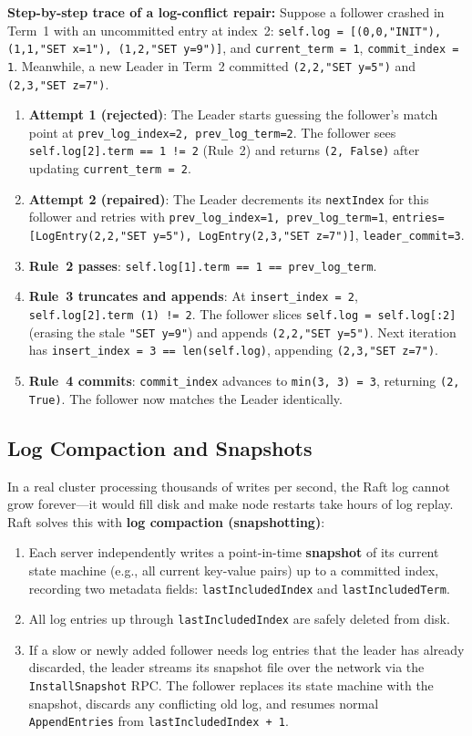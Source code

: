 \textbf{Step-by-step trace of a log-conflict repair:} Suppose a follower crashed in Term~1 with an uncommitted entry at index~2: \texttt{self.log = [(0,0,"INIT"), (1,1,"SET x=1"), (1,2,"SET y=9")]}, and \texttt{current\_term = 1}, \texttt{commit\_index = 1}. Meanwhile, a new Leader in Term~2 committed \texttt{(2,2,"SET y=5")} and \texttt{(2,3,"SET z=7")}.
\begin{enumerate}[leftmargin=18pt]
  \item \textbf{Attempt 1 (rejected)}: The Leader starts guessing the follower's match point at \texttt{prev\_log\_index=2, prev\_log\_term=2}. The follower sees \texttt{self.log[2].term == 1 != 2} (Rule~2) and returns \texttt{(2, False)} after updating \texttt{current\_term = 2}.
  \item \textbf{Attempt 2 (repaired)}: The Leader decrements its \texttt{nextIndex} for this follower and retries with \texttt{prev\_log\_index=1, prev\_log\_term=1}, \texttt{entries=[LogEntry(2,2,"SET y=5"), LogEntry(2,3,"SET z=7")]}, \texttt{leader\_commit=3}.
  \item \textbf{Rule~2 passes}: \texttt{self.log[1].term == 1 == prev\_log\_term}.
  \item \textbf{Rule~3 truncates and appends}: At \texttt{insert\_index = 2}, \texttt{self.log[2].term (1) != 2}. The follower slices \texttt{self.log = self.log[:2]} (erasing the stale \texttt{"SET y=9"}) and appends \texttt{(2,2,"SET y=5")}. Next iteration has \texttt{insert\_index = 3 == len(self.log)}, appending \texttt{(2,3,"SET z=7")}.
  \item \textbf{Rule~4 commits}: \texttt{commit\_index} advances to \texttt{min(3, 3) = 3}, returning \texttt{(2, True)}. The follower now matches the Leader identically.
\end{enumerate}

\subsection{Log Compaction and Snapshots}

In a real cluster processing thousands of writes per second, the Raft log cannot grow forever---it would fill disk and make node restarts take hours of log replay. Raft solves this with \textbf{log compaction (snapshotting)}:
\begin{enumerate}[leftmargin=18pt]
  \item Each server independently writes a point-in-time \textbf{snapshot} of its current state machine (e.g., all current key-value pairs) up to a committed index, recording two metadata fields: \texttt{lastIncludedIndex} and \texttt{lastIncludedTerm}.
  \item All log entries up through \texttt{lastIncludedIndex} are safely deleted from disk.
  \item If a slow or newly added follower needs log entries that the leader has already discarded, the leader streams its snapshot file over the network via the \texttt{InstallSnapshot} RPC. The follower replaces its state machine with the snapshot, discards any conflicting old log, and resumes normal \texttt{AppendEntries} from \texttt{lastIncludedIndex + 1}.
\end{enumerate}

